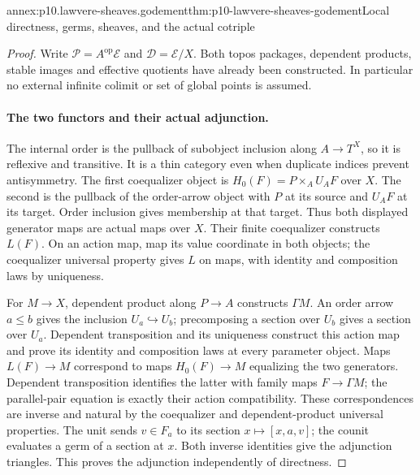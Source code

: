 \begin{annexitem}{annex:p10.lawvere-sheaves.godement}{thm:p10-lawvere-sheaves-godement}{Local directness, germs, sheaves, and the actual cotriple}
\begin{proof}
Write \(\mathcal P=A^{\mathrm{op}}\mathcal E\) and
\(\mathcal D=\mathcal E/X\).  Both topos packages,
dependent products, stable images and effective quotients
have already been constructed.  In particular no external
infinite colimit or set of global points is assumed.

\paragraph{The two functors and their actual adjunction.}
The internal order is the pullback of subobject inclusion
along \(A\to T^X\), so it is reflexive and transitive.
It is a thin category even when duplicate indices prevent
antisymmetry.  The first coequalizer object is
\(H_0(F)=P\times_AU_AF\) over \(X\).
The second is the pullback of the order-arrow object with
\(P\) at its source and \(U_AF\) at its target.
Order inclusion gives membership at that target.  Thus
both displayed generator maps are actual maps over \(X\).
Their finite coequalizer constructs \(L(F)\).  On an
action map, map its value coordinate in both objects;
the coequalizer universal property gives \(L\) on maps,
with identity and composition laws by uniqueness.

For \(M\to X\), dependent product along \(P\to A\)
constructs \(\Gamma M\).  An order arrow \(a\leq b\)
gives the inclusion \(U_a\hookrightarrow U_b\);
precomposing a section over \(U_b\) gives a section over
\(U_a\).  Dependent transposition and its uniqueness
construct this action map and prove its identity and
composition laws at every parameter object.
Maps \(L(F)\to M\) correspond to maps
\(H_0(F)\to M\) equalizing the two generators.
Dependent transposition identifies the latter with
family maps \(F\to\Gamma M\); the parallel-pair
equation is exactly their action compatibility.
These correspondences are inverse and natural by the
coequalizer and dependent-product universal properties.
The unit sends \(v\in F_a\) to its section
\(x\mapsto[x,a,v]\); the counit evaluates a germ
of a section at \(x\).  Both inverse identities
give the adjunction triangles.  This proves the
adjunction independently of directness.


\end{proof}
\end{annexitem}
